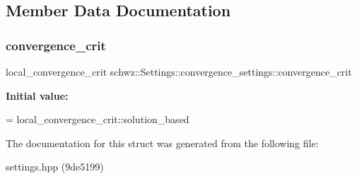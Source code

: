 \subsection{Member Data Documentation}
\mbox{\label{structschwz_1_1Settings_1_1convergence__settings_a509f2b6af29a7afeafda9d45f8e12623}} 
\subsubsection{\texorpdfstring{convergence\+\_\+crit}{convergence\_crit}}
{\footnotesize\ttfamily local\+\_\+convergence\+\_\+crit schwz\+::\+Settings\+::convergence\+\_\+settings\+::convergence\+\_\+crit}

{\bfseries Initial value\+:}
\begin{DoxyCode}
=
            local\_convergence\_crit::solution\_based
\end{DoxyCode}


The documentation for this struct was generated from the following file\+:\begin{DoxyCompactItemize}
\item 
settings.\+hpp (9de5199)\end{DoxyCompactItemize}
